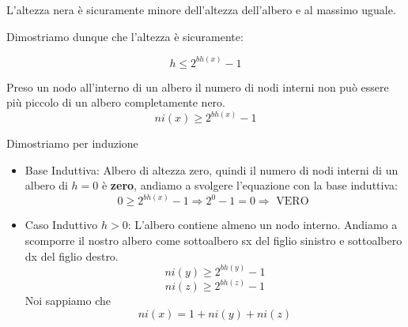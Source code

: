 L'altezza nera è sicuramente minore dell'altezza dell'albero e al massimo uguale.

Dimostriamo dunque che l'altezza è sicuramente:

$$h \le 2^{bh(x)}-1$$

Preso un nodo all'interno di un albero il numero di nodi interni non può essere più piccolo di un albero completamente nero.
$$ n i(x) \ge 2^{bh(x)} -1 $$

Dimostriamo per induzione

\begin{itemize}
	\item Base Induttiva: Albero di altezza zero, quindi il numero di nodi interni di un albero di $h=0$ è \textbf{zero}, andiamo a svolgere l'equazione con la base induttiva:
	$$ 0 \ge 2^{bh(x)}-1 \Rightarrow 2^0-1 = 0 \Rightarrow \text{ VERO }$$
	
	
	\item Caso Induttivo $h > 0$: L'albero contiene almeno un nodo interno. 
	Andiamo a scomporre il nostro albero come sottoalbero sx del figlio sinistro e sottoalbero dx del figlio destro.
	$$ ni(y) \ge 2^{bh(y)}-1 $$
	$$ ni(z) \ge 2^{bh(z)}-1 $$
	Noi sappiamo che 
	$$ ni(x)=1+ni(y)+ni(z) $$
	

\end{itemize}

